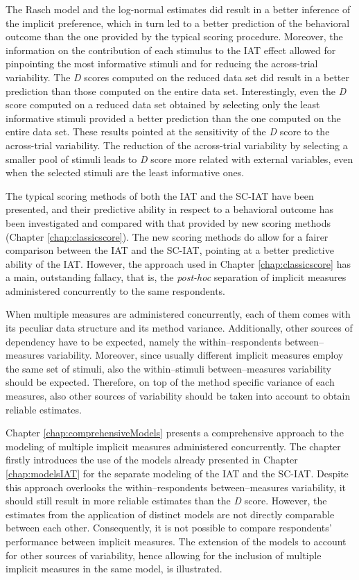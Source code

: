 \documentclass[12pt]{book}
\begin{document}
 
The Rasch model and the log-normal estimates did result in a better inference of the implicit preference, which in turn led to a better prediction of the behavioral outcome than the one provided by the typical scoring procedure. 
Moreover, the information on the contribution of each stimulus to the IAT effect allowed for pinpointing the most informative stimuli and for reducing the across-trial variability. 
The \emph{D} scores computed on the reduced data set did result in a better prediction than those computed on the entire data set. Interestingly, even the \emph{D} score computed on a reduced data set obtained by selecting only the least informative stimuli provided a better prediction than the one computed on the entire data set. 
These results pointed at the sensitivity of the \emph{D} score to the across-trial variability. 
The reduction of the across-trial variability by selecting a smaller pool of stimuli leads to \emph{D} score more related with external variables, even when the selected stimuli are the least informative ones.


The typical scoring methods of both the IAT and the SC-IAT have been presented, and their predictive ability in respect to a behavioral outcome has been investigated and compared with that provided by new scoring methods (Chapter \ref{chap:classicscore}). 
The new scoring methods do allow for a fairer comparison between the IAT and the SC-IAT, pointing at a better predictive ability of the IAT. 
However, the approach used in Chapter \ref{chap:classicscore} has a main, outstanding fallacy, that is, the \emph{post-hoc} separation of implicit measures administered concurrently to the same respondents. 

 When multiple measures are administered concurrently, each of them comes with its peculiar data structure and its method variance. 
Additionally, other sources of dependency have to be expected, namely the within--respondents between--measures variability. Moreover, since usually different implicit measures employ the same set of stimuli, also the within--stimuli between--measures variability should be expected.
Therefore, on top of the method specific variance of each measures, also other sources of variability should be taken into account to obtain reliable estimates.  

Chapter \ref{chap:comprehensiveModels} presents a comprehensive approach to the modeling of multiple implicit measures administered concurrently. 
The chapter firstly introduces the use of the models already presented in Chapter \ref{chap:modelsIAT} for the separate modeling of the IAT and the SC-IAT. 
Despite this approach overlooks the within--respondents between--measures variability, it should still result in more reliable estimates than the \emph{D} score.
However, the estimates from the application of distinct models are not directly comparable between each other. Consequently, it is not possible to compare respondents' performance between implicit measures. 
The extension of the models to account for other sources of variability, hence allowing for the inclusion of multiple implicit measures in the same model, is illustrated. 
\end{document}

